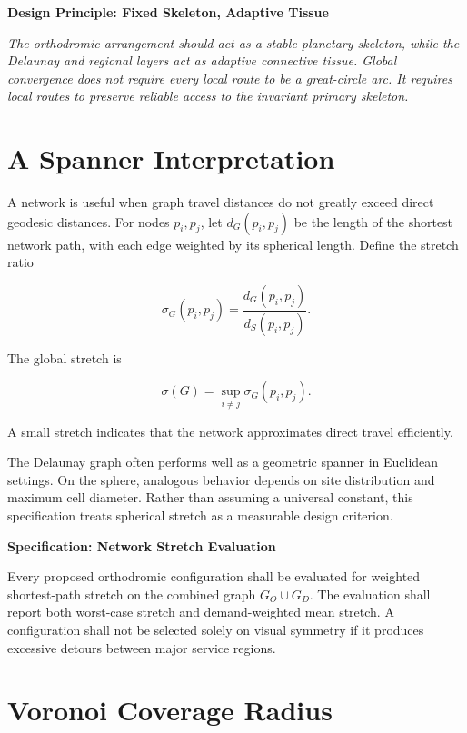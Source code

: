 \documentclass[11pt,fleqn]{book}
\numberwithin{equation}{chapter}
\newenvironment{principle}[1]
  {\begin{principleEnv}
   \noindent\textbf{Design Principle: #1}\par\smallskip\itshape}
  {\end{principleEnv}}
\newenvironment{specification}[1]
  {\begin{specificationEnv}
   \noindent\textbf{Specification: #1}\par\smallskip}
  {\end{specificationEnv}}
\theoremstyle{plain}
\theoremstyle{definition}
\theoremstyle{remark}
\begin{document}
\begin{principle}{Fixed Skeleton, Adaptive Tissue}
The orthodromic arrangement should act as a stable planetary skeleton, while the Delaunay and regional layers act as adaptive connective tissue. Global convergence does not require every local route to be a great-circle arc. It requires local routes to preserve reliable access to the invariant primary skeleton.
\end{principle}

\section{A Spanner Interpretation}

A network is useful when graph travel distances do not greatly exceed direct geodesic distances. For nodes \(p_i,p_j\), let \(d_G(p_i,p_j)\) be the length of the shortest network path, with each edge weighted by its spherical length. Define the stretch ratio

\begin{equation}
    \sigma_G(p_i,p_j)
    =
    \frac{
      d_G(p_i,p_j)
    }{
      d_S(p_i,p_j)
    }.
\end{equation}

The global stretch is

\begin{equation}
    \sigma(G)
    =
    \sup_{i\neq j}
    \sigma_G(p_i,p_j).
\end{equation}

A small stretch indicates that the network approximates direct travel efficiently.

The Delaunay graph often performs well as a geometric spanner in Euclidean settings. On the sphere, analogous behavior depends on site distribution and maximum cell diameter. Rather than assuming a universal constant, this specification treats spherical stretch as a measurable design criterion.

\begin{specification}{Network Stretch Evaluation}
Every proposed orthodromic configuration shall be evaluated for weighted shortest-path stretch on the combined graph \(G_O\cup G_D\). The evaluation shall report both worst-case stretch and demand-weighted mean stretch. A configuration shall not be selected solely on visual symmetry if it produces excessive detours between major service regions.
\end{specification}

\section{Voronoi Coverage Radius}
\end{document}
